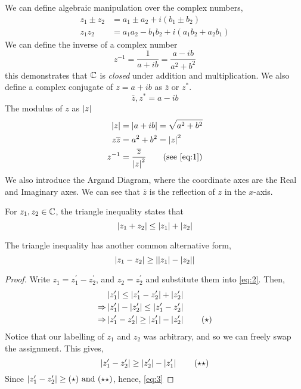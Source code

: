 \documentclass{article}
\numberwithin{equation}{section}
\begin{document}
We can define algebraic manipulation over the complex numbers,
\begin{align*}
    z_1 \pm z_2 &= a_1 \pm a_2 + i(b_1 \pm b_2) \\
    z_1z_2 &= a_1a_2 - b_1b_2 + i(a_1b_2 + a_2b_1)
\end{align*}
We can define the inverse of a complex number
\begin{equation}
    z^{-1} = \frac{1}{a + ib} = \frac{a - ib}{a^2 + b^2}\label{eq:1}
\end{equation}
this demonstrates that $\mathbb{C}$ is \emph{closed} under addition and multiplication. We also define a complex conjugate of $z = a + ib$ as $\overline{z}$ or $z^*$.
\[
    \overline{z}, z^* = a - ib
\]
The modulus of $z$ as $\left\lvert z\right\rvert$
\begin{align*}
    \abs{z} &= \abs{a + ib} = \sqrt{a^2 + b^2} \\
    z\overline{z} &= a^2 + b^2 = \abs{z}^2 \\
    z^{-1} &= \frac{\overline{z}}{\abs{z}^2} \tag{see \eqref{eq:1}}
\end{align*}
We also introduce the Argand Diagram, where the coordinate axes are the Real and Imaginary axes. We can see that $\overline{z}$ is the reflection of $z$ in the $x$-axis.

\begin{defi}
    For $z_1, z_2 \in \mathbb{C}$, the triangle inequality states that
    \begin{equation}
        \left\lvert z_1 + z_2\right\rvert \leq \left\lvert z_1\right\rvert + \left\lvert z_2\right\rvert\label{eq:2}
    \end{equation}
\end{defi}

\begin{prop}
    The triangle inequality has another common alternative form,
    \begin{equation}
        \left\lvert z_1 - z_2\right\rvert \geq \left\lvert \left\lvert z_1\right\rvert - \left\lvert z_2\right\rvert\right\rvert\label{eq:3}
    \end{equation}
\end{prop}

\begin{proof}
    Write $z_1 = z^{\prime}_1 - z^{\prime}_2$, and $z_2 = z^{\prime}_2$ and substitute them into \eqref{eq:2}. Then,
    \begin{align*}
        &\left\lvert z^{\prime}_1\right\rvert \leq \left\lvert z^{\prime}_1 - z^{\prime}_2\right\rvert + \left\lvert z^{\prime}_2\right\rvert \\
        \Rightarrow& \left\lvert z^{\prime}_1\right\rvert - \left\lvert z^{\prime}_2\right\rvert \leq\left\lvert z^{\prime}_1 - z^{\prime}_2\right\rvert\\
        \Rightarrow& \left\lvert z^{\prime}_1 - z^{\prime}_2\right\rvert \geq \left\lvert z^{\prime}_1\right\rvert - \left\lvert z^{\prime}_2\right\rvert \tag{$\star$}
    \end{align*}
    Notice that our labelling of $z_1$ and $z_2$ was arbitrary, and so we can freely swap the assignment. This gives,
    \[
        \left\lvert z^{\prime}_1 - z^{\prime}_2\right\rvert \geq \left\lvert z^{\prime}_2\right\rvert - \left\lvert z^{\prime}_1\right\rvert \tag{$\star\star$}
    \]
    Since $\left\lvert z^{\prime}_1 - z^{\prime}_2\right\rvert \geq (\star) \ \text{and} \ (\star\star)$, hence, \eqref{eq:3}
\end{proof}
\end{document}
